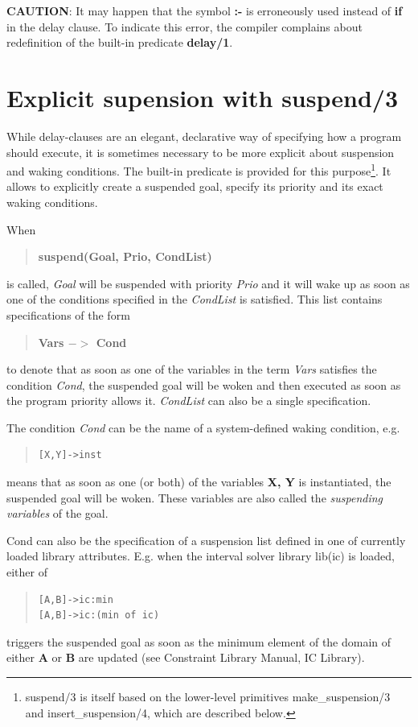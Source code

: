 {\bf CAUTION}: It may happen that the symbol {\bf :-} is erroneously
used instead of {\bf if} in the delay clause. To indicate this error,
the compiler complains about redefinition of the built-in predicate
{\bf delay/1}.


\section{Explicit supension with suspend/3}
\label{suspend3}
While delay-clauses are an elegant, declarative way of specifying how
a program should execute, it is sometimes necessary to be more explicit
about suspension and waking conditions.
The built-in predicate
is provided for this purpose\footnote{
suspend/3 is itself based on the lower-level primitives make_suspension/3
and insert_suspension/4, which are described below.}.
It allows to explicitly create a suspended goal, specify its priority
and its exact waking conditions.

When
\begin{quote}
{\bf suspend(Goal, Prio, CondList)}
\end{quote}
is called, {\it Goal} will be suspended with priority {\it Prio}
and it will wake up
as soon as one of the conditions specified in the {\it CondList}
is satisfied.
This list contains specifications of the form
\begin{quote}
{\bf Vars $->$ Cond}
\end{quote}
to denote that as soon as one of the variables in the term {\it Vars}
satisfies the condition {\it Cond}, the suspended goal will
be woken and then executed as soon as the program priority allows it.
{\it CondList} can also be a single specification.

The condition {\it Cond} can be the name of a system-defined waking condition,
e.g.
\begin{quote}\begin{verbatim}
[X,Y]->inst
\end{verbatim}\end{quote}
means that as soon as one (or both) of the variables {\bf X, Y}
is instantiated, the suspended goal will be woken.
These variables are also called the {\it suspending variables} of the goal.


Cond can also be the specification of a suspension list
defined in one of currently loaded library attributes. E.g. when the
interval solver library lib(ic) is loaded, either of
\begin{quote}\begin{verbatim}
[A,B]->ic:min
[A,B]->ic:(min of ic)
\end{verbatim}\end{quote}
triggers the suspended goal as soon as the minimum element
of the domain of either {\bf A} or {\bf B} are updated
(see Constraint Library Manual, IC Library).

